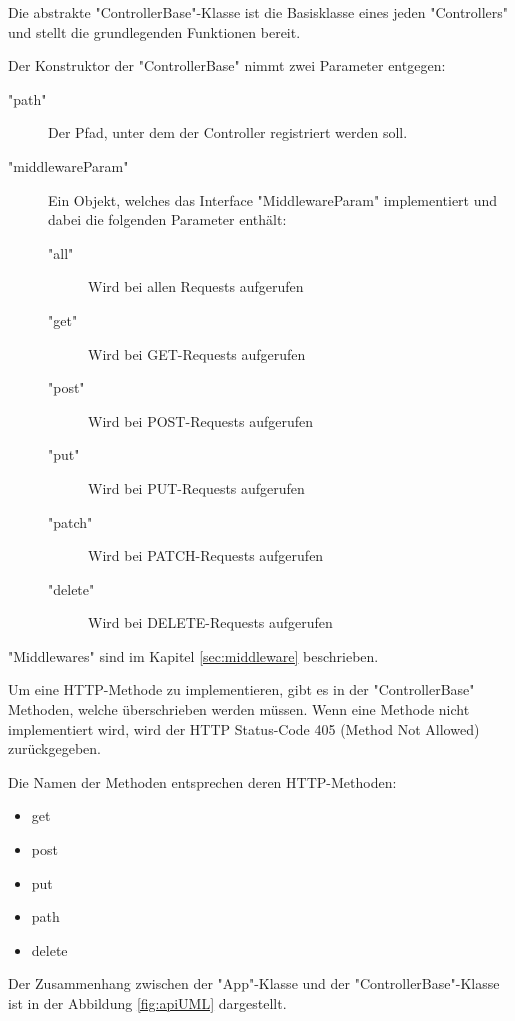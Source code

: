 
Die abstrakte "ControllerBase"-Klasse ist die Basisklasse eines jeden "Controllers" und stellt die grundlegenden Funktionen bereit. 

Der Konstruktor der "ControllerBase" nimmt zwei Parameter entgegen:

\begin{description}
    \item["path"] Der Pfad, unter dem der Controller registriert werden soll.
    \item["middlewareParam"] Ein Objekt, welches das Interface "MiddlewareParam" implementiert und dabei die folgenden Parameter enthält:
    \begin{description}
        \item["all"] Wird bei allen Requests aufgerufen
        \item["get"] Wird bei GET-Requests aufgerufen
        \item["post"] Wird bei POST-Requests aufgerufen
        \item["put"] Wird bei PUT-Requests aufgerufen
        \item["patch"] Wird bei PATCH-Requests aufgerufen
        \item["delete"] Wird bei DELETE-Requests aufgerufen
    \end{description}
\end{description}


"Middlewares" sind im Kapitel \ref{sec:middleware} beschrieben.

Um eine HTTP-Methode zu implementieren, gibt es in der "ControllerBase" Methoden, welche überschrieben werden müssen. Wenn eine Methode nicht implementiert wird, wird der HTTP Status-Code 405 (Method Not Allowed) zurückgegeben.

Die Namen der Methoden entsprechen deren HTTP-Methoden:
\begin{itemize}
    \item get
    \item post
    \item put
    \item path
    \item delete
\end{itemize}


Der Zusammenhang zwischen der "App"-Klasse und der "ControllerBase"-Klasse ist in der Abbildung \ref{fig:apiUML} dargestellt.


